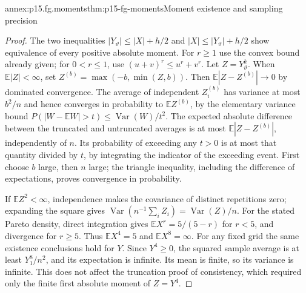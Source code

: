\begin{annexitem}{annex:p15.fg.moments}{thm:p15-fg-moments}{Moment existence and sampling precision}
\begin{proof}
The two inequalities \(|Y_\vartheta|\leq|X|+h/2\) and
\(|X|\leq|Y_\vartheta|+h/2\) show equivalence of every positive
absolute moment. For \(r\geq1\) use the convex bound already given;
for \(0<r\leq1\), use \((u+v)^r\leq u^r+v^r\).
Let \(Z=Y_\vartheta^k\). When \(\mathbb E|Z|<\infty\), set
\(Z^{(b)}=\max(-b,\min(Z,b))\). Then
\(\mathbb E|Z-Z^{(b)}|\to0\) by dominated convergence.
The average of independent \(Z_i^{(b)}\) has variance at most \(b^2/n\)
and hence converges in probability to \(\mathbb EZ^{(b)}\), by the
elementary variance bound
\(P(|W-\mathbb EW|>t)\leq\operatorname{Var}(W)/t^2\).
The expected absolute difference between the truncated and untruncated
averages is at most \(\mathbb E|Z-Z^{(b)}|\), independently of \(n\).
Its probability of exceeding any \(t>0\) is at most that quantity
divided by \(t\), by integrating the indicator of the exceeding event.
First choose \(b\) large, then \(n\) large; the triangle inequality,
including the difference of expectations, proves convergence in probability.

If \(\mathbb EZ^2<\infty\), independence makes the covariance of
distinct repetitions zero; expanding the square gives
\(\operatorname{Var}(n^{-1}\sum_iZ_i)=\operatorname{Var}(Z)/n\).
For the stated Pareto density, direct integration gives
\(\mathbb EX^r=5/(5-r)\) for \(r<5\), and divergence for
\(r\geq5\). Thus \(\mathbb EX^4=5\) and \(\mathbb EX^8=\infty\).
For any fixed grid the same existence conclusions hold for \(Y\).
Since \(Y^4\geq0\), the squared sample average is at least
\(Y_1^8/n^2\), and its expectation is infinite. Its mean is finite,
so its variance is infinite. This does not affect the truncation proof
of consistency, which required only the finite first absolute moment of
\(Z=Y^4\).
\end{proof}
\end{annexitem}

